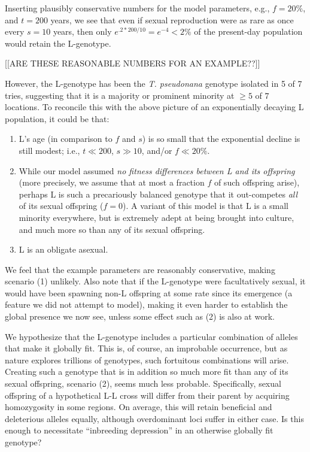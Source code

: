 \documentclass{article}\usepackage[]{graphicx}\usepackage[]{color}
\begin{document}
Inserting plausibly conservative numbers for the model parameters, e.g., $f = 20\%$, and $t=200$
years, we see that even if sexual reproduction were as rare as once every $s = 10$ years, then only
$e^{.2 * 200/10} = e^{-4} < 2\%$ of the present-day population would retain the L-genotype.

[[ARE THESE REASONABLE NUMBERS FOR AN EXAMPLE??]]

However, the L-genotype has been the \textit{T. pseudonana} genotype isolated in 5 of 7 tries,
suggesting that it is a majority or prominent minority at $\geq 5$ of $7$ locations. To reconcile
this with the above picture of an exponentially decaying L population, it could be that:

\begin{enumerate}
\item L's age (in comparison to $f$ and $s$) is so small that the exponential decline is still
  modest; i.e., $t \ll 200$, $s \gg 10$, and/or $f \ll 20\%$.

\item While our model assumed \textit{no fitness differences between L and its offspring} (more
  precisely, we assume that at most a fraction $f$ of such offspring arise), perhaps L is such a
  precariously balanced genotype that it out-competes \textit{all} of its sexual offspring ($f=0$).
  A variant of this model is that L is a small minority everywhere, but is extremely adept at being
  brought into culture, and much more so than any of its sexual offspring.

\item L is an obligate asexual.
\end{enumerate}

We feel that the example parameters are reasonably conservative, making scenario (1) unlikely.  Also
note that if the L-genotype were facultatively sexual, it would have been spawning non-L offspring
at some rate since its emergence (a feature we did not attempt to model), making it even harder to
establish the global presence we now see, unless some effect such as (2) is also at work.

We hypothesize that the L-genotype includes a particular combination of alleles that make it
globally fit.  This is, of course, an improbable occurrence, but as nature explores trillions of
genotypes, such fortuitous combinations will arise.  Creating such a genotype that is in addition so
much more fit than any of its sexual offspring, scenario (2), seems much less
probable. Specifically, sexual offspring of a hypothetical L-L cross will differ from their parent
by acquiring homozygosity in some regions.  On average, this will retain beneficial and deleterious
alleles equally, although overdominant loci suffer in either case.  Is this enough to necessitate
``inbreeding depression'' in an otherwise globally fit genotype?
\end{document}
